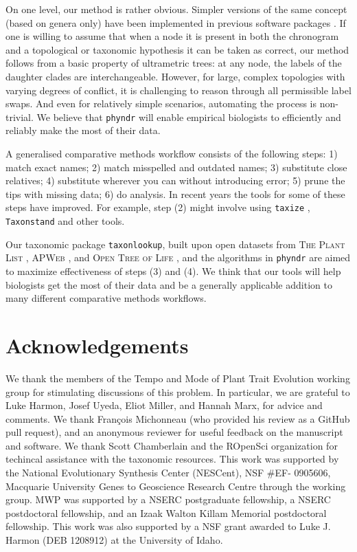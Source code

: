 \documentclass[a4paper,11pt]{article}
\newcommand{\phyndr}{\tt phyndr}
\newcommand{\taxonlookup}{\tt taxonlookup}
\begin{document}
On one level, our method is rather obvious. Simpler versions of the same concept (based on genera only) have been implemented in previous software packages \citep[e.g., \texttt{phyloGenerator};][]{pearse2013phylogenerator}.  If one is willing to assume that when a node it is present in both the chronogram and a topological or taxonomic hypothesis it can be taken as correct, our method follows from a basic property of ultrametric trees: at any node, the labels of the daughter clades are interchangeable. However, for large, complex topologies with varying degrees of conflict, it is challenging to reason through all permissible label swaps. And even for relatively simple scenarios, automating the process is non-trivial. We believe that {\phyndr} will enable empirical biologists to efficiently and reliably make the most of their data.

A generalised comparative methods workflow consists of the following steps:  1) match exact names; 2) match misspelled and outdated names; 3) substitute close relatives; 4) substitute wherever you can without introducing error; 5) prune the tips with missing data; 6) do analysis.  In recent years the tools for some of these steps have improved.  For example, step (2) might involve using \texttt{taxize} \citep{taxize}, \texttt{Taxonstand} \citep{cayuela2012} and other tools.

Our taxonomic package {\taxonlookup}, built upon open datasets from \textsc{The Plant List} \citep{ThePlantList}, \textsc{APWeb} \citep{apweb}, and \textsc{Open Tree of Life} \citep{OpenTree}, and the algorithms in {\phyndr} are aimed to maximize effectiveness of steps (3) and (4). We think that our tools will help biologists get the most of their data and be a generally applicable addition to many different comparative methods workflows.

\section{Acknowledgements}
We thank the members of the Tempo and Mode of Plant Trait
Evolution working group for stimulating discussions of this problem. In particular, we are grateful to Luke Harmon, Josef Uyeda, Eliot Miller, and Hannah Marx, for advice and comments. We thank Fran\c{c}ois Michonneau (who provided his review as a GitHub pull request), and an anonymous reviewer for useful feedback on the manuscript and software. We thank Scott Chamberlain and the ROpenSci organization for techincal assistance with the taxonomic resources. This work was supported by the National Evolutionary Synthesis Center
(NESCent), NSF \#EF- 0905606, Macquarie University Genes to Geoscience
Research Centre through the working group. MWP was supported by a NSERC postgraduate fellowship, a NSERC postdoctoral fellowship, and an Izaak Walton Killam Memorial postdoctoral fellowship. This work was also supported by a NSF grant awarded to Luke J. Harmon (DEB 1208912) at the University of Idaho.
\end{document}
